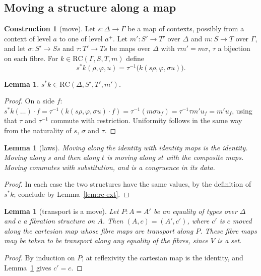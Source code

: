 \documentclass[11pt]{article}
\newcommand{\RC}{\mathrm{RC}}
\theoremstyle{plain}
\newtheorem{lemma}[theorem]{Lemma}
\theoremstyle{definition}
\newtheorem{construction}[theorem]{Construction}
\theoremstyle{remark}
\begin{document}
\subsection{Moving a structure along a map}

\begin{construction}[move]\label{con:move}
Let $s:\Delta\to\Gamma$ be a map of contexts, possibly from a context of
level $a$ to one of level $a^+$. Let $m':S'\to T'$ over $\Delta$ and
$m:S\to T$ over $\Gamma$, and let $\sigma:S'\to Ss$ and
$\tau:T'\to Ts$ be maps over $\Delta$ with $\tau m'=m\sigma$, $\tau$
a bijection on each fibre. For $k\in\RC(\Gamma,S,T,m)$ define
\[
s^*k(\rho,\varphi,u)=\tau^{-1}\bigl(k(s\rho,\varphi,\sigma u)\bigr).
\]
\end{construction}

\begin{lemma}
$s^*k\in\RC(\Delta,S',T',m')$.
\end{lemma}

\begin{proof}
On a side $f$:
$s^*k(\ldots)\cdot f=\tau^{-1}(k(s\rho,\varphi,\sigma u)\cdot f)
=\tau^{-1}(m\sigma u_f)=\tau^{-1}\tau m'u_f=m'u_f$, using that $\tau$
and $\tau^{-1}$ commute with restriction. Uniformity follows in the same
way from the naturality of $s$, $\sigma$ and $\tau$.
\end{proof}

\begin{lemma}[laws]\label{lem:move-laws}
Moving along the identity with identity maps is the identity. Moving
along $s$ and then along $t$ is moving along $st$ with the composite
maps. Moving commutes with substitution, and is a congruence in its data.
\end{lemma}

\begin{proof}
In each case the two structures have the same values, by the definition
of $s^*k$; conclude by Lemma~\ref{lem:rc-ext}.
\end{proof}

\begin{lemma}[transport is a move]\label{lem:tr-move}
Let $P:A=A'$ be an equality of types over $\Delta$ and $c$ a fibration
structure on $A$. Then $(A,c)=(A',c')$, where $c'$ is $c$ moved along the
cartesian map whose fibre maps are transport along $P$. These fibre maps
may be taken to be transport along any equality of the fibres, since $V$
is a set.
\end{lemma}

\begin{proof}
By induction on $P$; at reflexivity the cartesian map is the identity,
and Lemma~\ref{lem:move-laws} gives $c'=c$.
\end{proof}
\end{document}
